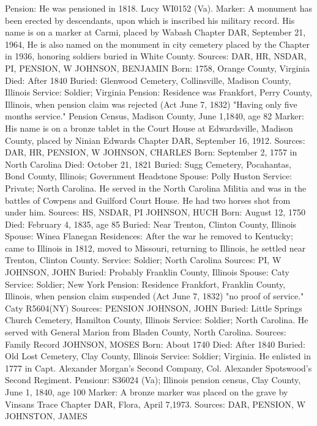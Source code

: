 Pension: He was pensioned in 1818. Lucy WI0152 (Va). 
Marker: A monument has been erected by descendants, upon which is inscribed his military record. His name is on a marker at Carmi, placed by Wabash Chapter DAR, September 21, 1964, He is also named on the monument in city cemetery placed by the Chapter in 1936, honoring soldiers buried in White County. 
Sources: DAR, HR, NSDAR, PI, PENSION, W 
JOHNSON, BENJAMIN 
Born: 1758, Orange County, Virginia 
Died: After 1840 
Buried: Glenwood Cemetery, Collinsville, Madison County, Illinois 
Service: Soldier; Virginia
Pension: Residence was Frankfort, Perry County, Illinois, when pension claim was rejected (Act June 7, 1832) "Having only five months service." Pension Census, Madison County, June 1,1840, age 82
Marker: His name is on a bronze tablet in the Court House at Edwardsville, Madison County, placed by Ninian Edwards Chapter DAR, September 16, 1912. 
Sources: DAR, HR, PENSION, W 
JOHNSON, CHARLES 
Born: September 2, 1757 in North Carolina
Died: October 21, 1821 
Buried: Sugg Cemetery, Pocahantas, Bond County, Illinois; Government Head­stone 
Spouse: Polly Huston
Service: Private; North Carolina. He served in the North Carolina Militia and was in the battles of Cowpens and Guilford Court House. He had two horses shot from under him. 
Sources: HS, NSDAR, PI 
JOHNSON, HUCH 
Born: August 12, 1750
Died: February 4, 1835, age 85 
Buried: Near Trenton, Clinton County, Illinois 
Spouse: Winea Flanegan 
Residences: After the war he removed to Kentucky; came to Illinois in 1812, moved to Missouri, returning to Illinois, he settled near Trenton, Clinton County.
Service: Soldier; North Carolina 
Sources: PI, W 
JOHNSON, JOHN 
Buried: Probably Franklin County, Illinois 
Spouse: Caty
Service: Soldier; New York
Pension: Residence Frankfort, Franklin County, Illinois, when pension claim suspended (Act June 7, 1832) "no proof of service." Caty R5604(NY) 
Sources: PENSION 
JOHNSON, JOHN 
Buried: Little Springs Church Cemetery, Hamilton County, Illinois
Service: Soldier; North Carolina. He served with General Marion from Bladen County, North Carolina. 
Sources: Family Record 
JOHNSON, MOSES 
Born: About 1740
Died: After 1840 
Buried: Old Lost Cemetery, Clay County, Illinois
Service: Soldier; Virginia. He enlisted in 1777 in Capt. Alexander Morgan's Second Company, Col. Alexander Spotswood's Second Regiment.
Pensionr: S36024 (Va); Illinois pension census, Clay County, June 1, 1840, age 100
Marker: A bronze marker was placed on the grave by Vinsans Trace Chapter DAR, Flora, April 7,1973. 
Sources: DAR, PENSION, W 
JOHNSTON, JAMES 
